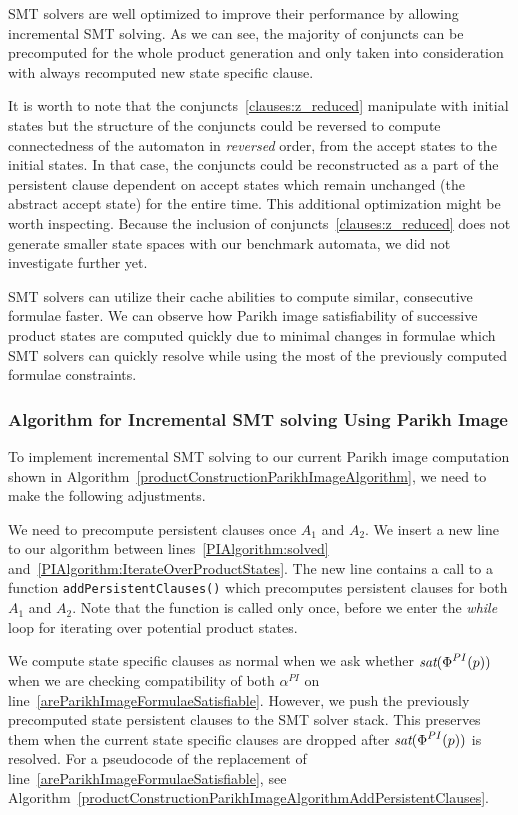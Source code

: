 SMT solvers are well optimized to improve their performance by allowing incremental SMT solving. As we can see, the majority of conjuncts can be precomputed for the whole product generation and only taken into consideration with always recomputed new state specific clause.

It is worth to note that the conjuncts~\ref{clauses:z_reduced} manipulate with initial states but the structure of the conjuncts could be reversed to compute connectedness of the automaton in \emph{reversed} order, from the accept states to the initial states. In that case, the conjuncts could be reconstructed as a part of the persistent clause dependent on accept states which remain unchanged (the abstract accept state) for the entire time. This additional optimization might be worth inspecting. Because the inclusion of conjuncts~\ref{clauses:z_reduced} does not generate smaller state spaces with our benchmark automata, we did not investigate further yet.

SMT solvers can utilize their cache abilities to compute similar, consecutive formulae faster. We can observe how Parikh image satisfiability of successive product states are computed quickly due to minimal changes in formulae which SMT solvers can quickly resolve while using the most of the previously computed formulae constraints.

\subsubsection{Algorithm for Incremental SMT solving Using Parikh Image}


To implement incremental SMT solving to our current Parikh image computation shown in Algorithm~\ref{productConstructionParikhImageAlgorithm}, we need to make the following adjustments.

We need to precompute persistent clauses once $A_1$ and $A_2$. We insert a new line to our algorithm between lines~\ref{PIAlgorithm:solved} and~\ref{PIAlgorithm:IterateOverProductStates}. The new line contains a call to a function \texttt{addPersistentClauses()} which precomputes persistent clauses for both $A_1$ and $A_2$. Note that the function is called only once, before we enter the \emph{while} loop for iterating over potential product states.

We compute state specific clauses as normal when we ask whether $\emph{sat}(\emph{$\Phi$}^{PI}(p))$ when we are checking compatibility of both $\alpha^{PI}$ on line~\ref{areParikhImageFormulaeSatisfiable}. However, we push the previously precomputed state persistent clauses to the SMT solver stack. This preserves them when the current state specific clauses are dropped after $\emph{sat}(\emph{$\Phi$}^{PI}(p))$ is resolved. For a pseudocode of the replacement of line~\ref{areParikhImageFormulaeSatisfiable}, see Algorithm~\ref{productConstructionParikhImageAlgorithmAddPersistentClauses}.

